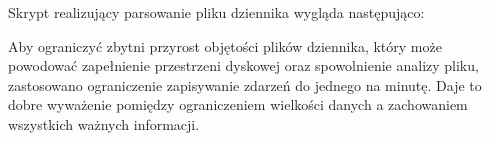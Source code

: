		Skrypt realizujący parsowanie pliku dziennika wygląda następująco:
		\footnotesize
		
		\normalsize

		Aby ograniczyć zbytni przyrost objętości plików dziennika, który może powodować zapełnienie przestrzeni dyskowej oraz spowolnienie analizy pliku, zastosowano ograniczenie zapisywanie zdarzeń do jednego na minutę.
		Daje to dobre wyważenie pomiędzy ograniczeniem wielkości danych a zachowaniem wszystkich ważnych informacji.
